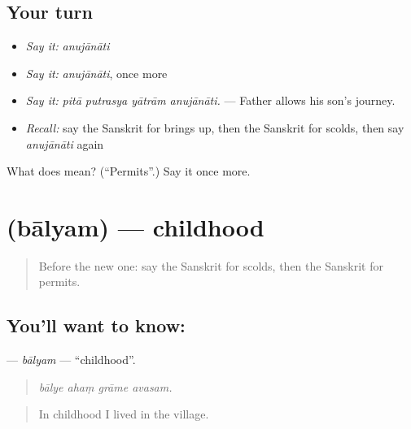 \subsection*{Your turn}
\begin{itemize}
\raggedright
  \item \emph{Say it:} \emph{anujānāti}
  \item \emph{Say it:} \emph{anujānāti}, once more
  \item \emph{Say it:} \emph{pitā putrasya yātrām anujānāti.} — Father allows his son's journey.
  \item \emph{Recall:} say the Sanskrit for brings up, then the Sanskrit for scolds, then say \emph{anujānāti} again
\end{itemize}

\begin{tcolorbox}[breakable,colback=teal!4,colframe=teal!35!black,title={Before you move on}]
What does  mean? (\textquotedblleft{}Permits\textquotedblright{}.) Say it once more.
\end{tcolorbox}
\section[\texorpdfstring{\sk{बाल्यम्} (bālyam)}{बाल्यम् (bālyam)}]{ (bālyam) — childhood}

\label{lesson:SA-C494-balyam}



\begin{quote}
Before the new one: say the Sanskrit for scolds, then the Sanskrit for permits.
\end{quote}

\subsection*{You'll want to know: }
\textbf{} — \emph{bālyam} — \textquotedblleft{}childhood\textquotedblright{}.

\begin{quote}
   
\end{quote}

\begin{quote}
\emph{bālye ahaṃ grāme avasam.}
\end{quote}

\begin{quote}
In childhood I lived in the village.
\end{quote}

